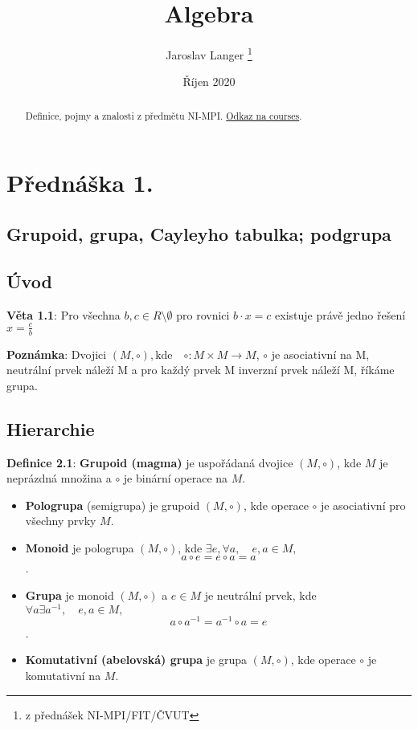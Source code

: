 \documentclass[12pt, letterpaper, twoside]{article}
\title{Algebra}
\author{Jaroslav Langer \thanks{z přednášek NI-MPI/FIT/ČVUT}}
\date{Říjen 2020}
\begin{document}
\maketitle

\tableofcontents

\begin{abstract}
Definice, pojmy a znalosti z předmětu NI-MPI. \href{https://courses.fit.cvut.cz/NI-MPI/lectures/index.html}{Odkaz na courses}.
\end{abstract}

\section{Přednáška 1.}

\subsection*{Grupoid, grupa, Cayleyho tabulka; podgrupa}

\subsection{Úvod}

\textbf{Věta 1.1}: Pro všechna $b,c \in R \setminus \emptyset$ pro rovnici $b \cdot x = c$ existuje právě jedno řešení $x = \frac{c}{b}$

\textbf{Poznámka}: Dvojici $(M, \circ), \textrm{kde} \quad \circ: M \times M \to M$,
$\circ$ je asociativní na M, neutrální prvek náleží M a pro každý prvek M inverzní prvek náleží M, říkáme grupa.

\subsection{Hierarchie}

\textbf{Definice 2.1}: \textbf{Grupoid (magma)} je uspořádaná dvojice $(M, \circ)$,
kde $M$ je neprázdná množina a $\circ$ je binární operace na $M$.
\begin{itemize}
    \item \textbf{Pologrupa} (semigrupa) je grupoid $(M, \circ)$,
        kde operace $\circ$ je asociativní pro všechny prvky $M$.
    \item \textbf{Monoid} je pologrupa $(M, \circ)$,
        kde $\exists e, \forall a, \quad e,a \in M,$ \[a \circ e = e \circ a = a\].
    \item \textbf{Grupa} je monoid $(M, \circ)$ a $e \in M$ je neutrální prvek,
        kde $\forall a \exists a^{-1}, \quad e,a \in M,$ \[a \circ a^{-1} = a^{-1} \circ a = e\].
    \item \textbf{Komutativní (abelovská) grupa} je grupa $(M, \circ)$,
        kde operace $\circ$ je komutativní na $M$.
\end{itemize}
\end{document}
